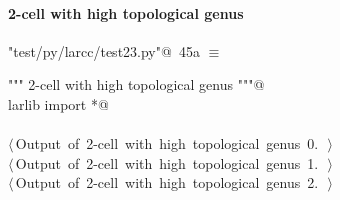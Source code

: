 \documentclass[11pt,oneside]{article}	%
\begin{document}
\paragraph{2-cell with high topological genus}

\begin{flushleft} \small \label{scrap74}
\protect{}\verb@"test/py/larcc/test23.py"@\nobreak\ {\footnotesize 45a }$\equiv$
\vspace{-1ex}
\begin{list}{}{} \item
\mbox{}\verb@""" 2-cell with high topological genus """@\\
\mbox{}\verb@from larlib import *@\\
\mbox{}\verb@@\\
\mbox{}\verb@@\hbox{$\langle\,$Output of 2-cell with high topological genus 0.\nobreak\ {\footnotesize {}}$\,\rangle$}\verb@@\\
\mbox{}\verb@@\hbox{$\langle\,$Output of 2-cell with high topological genus 1.\nobreak\ {\footnotesize {}}$\,\rangle$}\verb@@\\
\mbox{}\verb@@\hbox{$\langle\,$Output of 2-cell with high topological genus 2.\nobreak\ {\footnotesize {}}$\,\rangle$}\verb@@\\
\mbox{}\verb@@{\NWsep}
\end{list}
\vspace{-2ex}
\end{flushleft}
\end{document}
